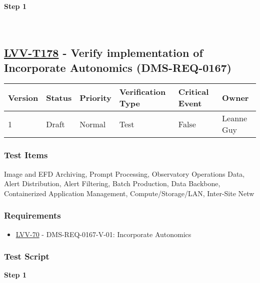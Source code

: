 \textbf{Step 1}\\
~\\
~\\

\hypertarget{lvv-t178---verify-implementation-of-incorporate-autonomics-dms-req-0167}{%
\subsection{\texorpdfstring{\href{https://jira.lsstcorp.org/secure/Tests.jspa\#/testCase/LVV-T178}{LVV-T178}
- Verify implementation of Incorporate Autonomics
(DMS-REQ-0167)}{LVV-T178 - Verify implementation of Incorporate Autonomics (DMS-REQ-0167)}}\label{lvv-t178---verify-implementation-of-incorporate-autonomics-dms-req-0167}}

\begin{longtable}[]{@{}llllll@{}}
\toprule
Version & Status & Priority & Verification Type & Critical Event &
Owner\tabularnewline
\midrule
\endhead
1 & Draft & Normal & Test & False & Leanne Guy\tabularnewline
\bottomrule
\end{longtable}

\hypertarget{test-items-78}{%
\subsubsection{Test Items}\label{test-items-78}}

Image and EFD Archiving, Prompt Processing, Observatory Operations Data,
Alert Distribution, Alert Filtering, Batch Production, Data Backbone,
Containerized Application Management, Compute/Storage/LAN, Inter-Site
Netw

\hypertarget{requirements-78}{%
\subsubsection{Requirements}\label{requirements-78}}

\begin{itemize}
\tightlist
\item
  \href{https://jira.lsstcorp.org/browse/LVV-70}{LVV-70} -
  DMS-REQ-0167-V-01: Incorporate Autonomics
\end{itemize}

\hypertarget{test-script-78}{%
\subsubsection{Test Script}\label{test-script-78}}

\textbf{Step 1}\\
~\\
~\\

